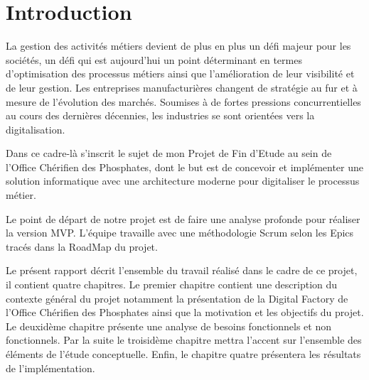 \chapter{Introduction}


La gestion des activit\'es m\'etiers devient de plus en plus un d\'efi majeur pour les soci\'et\'es, un d\'efi qui est aujourd'hui un point d\'eterminant en termes d'optimisation des processus m\'etiers ainsi que l'am\'elioration de leur visibilit\'e et de leur gestion. Les entreprises manufacturi\`eres changent de strat\'egie au fur et \`a mesure de l'\'evolution des march\'es. Soumises \`a de fortes pressions concurrentielles au cours des derni\`eres d\'ecennies, les industries se sont orient\'ees vers la digitalisation.

Dans ce cadre-l\`a s'inscrit le sujet de mon Projet de Fin d'Etude au sein de l'Office Ch\'erifien des Phosphates, dont le but est de concevoir et impl\'ementer une solution informatique avec une architecture moderne pour digitaliser le processus m\'etier.

Le point de d\'epart de notre projet est de faire une analyse profonde pour r\'ealiser la version \gls{MVP}. L'\'equipe  travaille avec une m\'ethodologie Scrum selon les Epics trac\'es dans la RoadMap du projet.

Le pr\'esent rapport d\'ecrit l'ensemble du travail r\'ealis\'e dans le cadre de ce projet, il contient quatre chapitres. Le premier chapitre contient une description du contexte g\'en\'eral du projet notamment la pr\'esentation de la Digital Factory de l'Office Ch\'erifien des Phosphates ainsi que la motivation et les objectifs du projet. Le deuxid\`eme chapitre pr\'esente une analyse de besoins fonctionnels et non fonctionnels. Par la suite le troisid\`eme chapitre mettra l'accent sur l'ensemble des \'el\'ements de l'\'etude conceptuelle. Enfin, le chapitre quatre pr\'esentera les r\'esultats de l'impl\'ementation.